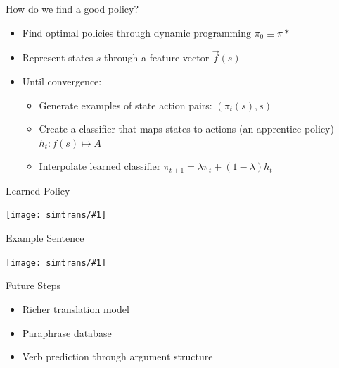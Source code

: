 \documentclass[compress]{beamer}
\newcommand{\gfxs}[2]{
\begin{center}
	\texttt{[image: simtrans/\#1]}
\end{center}
}
\begin{document}
\begin{frame}{How do we find a good policy?}

  \begin{itemize}
    \item Find optimal policies through dynamic programming $\pi_0
      \equiv \pi*$
    \item Represent states $s$ through a feature vector $\vec f(s)$
      \pause
    \item Until convergence:
      \begin{itemize}
        \item Generate examples of state action pairs: $(\pi_t(s), s)$
        \item Create a classifier that maps states to actions (an
          apprentice policy) $h_t: f(s) \mapsto A$ 
    \item Interpolate learned classifier $\pi_{t+1} = \lambda \pi_t +
      (1-\lambda) h_t$
  \end{itemize}
  \end{itemize}

\end{frame}


\begin{frame}{Learned Policy}

  \gfxs{learned_policy}{.8}

\end{frame}

\begin{frame}{Example Sentence}

  \gfxs{ex_imperfect}{.7}

\end{frame}

\begin{frame}{Future Steps}

  \begin{itemize}
    \item Richer translation model
    \item Paraphrase database
    \item Verb prediction through argument structure
  \end{itemize}

\end{frame}








	
\end{document}
